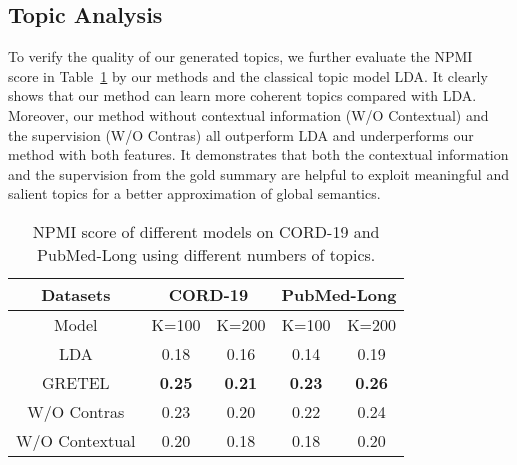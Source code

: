 \documentclass[11pt]{article}
\begin{document}
\subsection{Topic Analysis}
To verify the quality of our generated topics, we further evaluate the NPMI~\cite{lau2014machine} score in Table~\ref{tab:npm} by our methods and the classical topic model LDA.
It clearly shows that our method can learn more coherent topics compared with LDA.
Moreover, our method without contextual information (W/O Contextual) and the supervision (W/O Contras) all outperform LDA and underperforms our method with both features.
It demonstrates that both the contextual information and the supervision from the gold summary are helpful to exploit meaningful and salient topics for a better approximation of global semantics.
\begin{table}[!hbt]
\scriptsize
    \centering
    
\begin{tabular}{c|c|c|c|c}
    \hline
    \bf{Datasets} & \multicolumn{2}{c|}{\bf{CORD-19}} & \multicolumn{2}{c}{\bf{PubMed-Long}}\\ 
    \hline
    Model&K=100&K=200&K=100&K=200\\
    \hline
    LDA&0.18&0.16&0.14&0.19\\
    GRETEL&\bf{0.25}&\bf{0.21}&\bf{0.23}&\bf{0.26}\\
    W/O Contras&0.23&0.20&0.22&0.24\\
    W/O Contextual&0.20&0.18&0.18&0.20\\
    \hline
    \end{tabular}
\caption{NPMI score of different models on CORD-19 and PubMed-Long using different numbers of topics.}
    \label{tab:npm}
\end{table}
\end{document}
